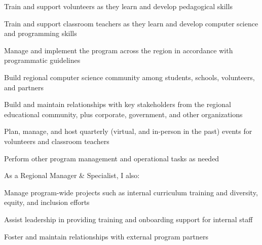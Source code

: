 \begin{cventries}
{\begin{cvitems}
		\begin{cvitems}
		\item Train and support volunteers as they learn and develop pedagogical skills
		\item Train and support classroom teachers as they learn and develop computer science and programming skills
	\end{cvitems}
	\vspace{2mm}
	\item Manage and implement the program across the region in accordance with programmatic guidelines\\
		\begin{cvitems}
		\item Build regional computer science community among students, schools, volunteers, and partners
		\item Build and maintain relationships with key stakeholders from the regional educational community, plus corporate, government, and other organizations
		\item Plan, manage, and host quarterly (virtual, and in-person in the past) events for volunteers and classroom teachers
		\item Perform other program management and operational tasks as needed
	\end{cvitems}
	\vspace{2mm}
	\item As a Regional Manager \& Specialist, I also:\\
		\begin{cvitems}
		\item Manage program-wide projects such as internal curriculum training and diversity, equity, and inclusion efforts
		\item Assist leadership in providing training and onboarding support for internal staff
		\item Foster and maintain relationships with external program partners
		\end{cvitems}
      \end{cvitems}
    }


\end{cventries}
